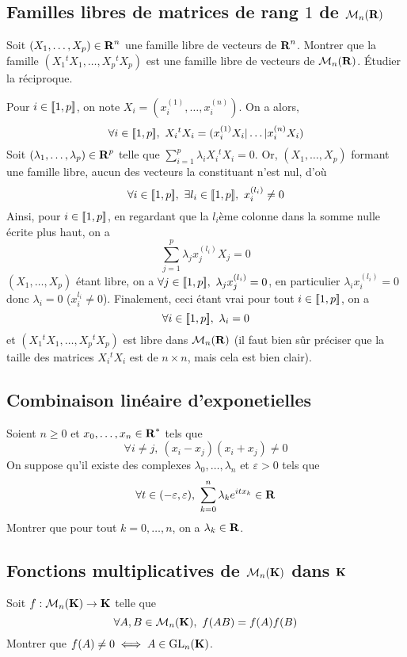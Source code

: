\subsection{Familles libres de matrices de rang $1$ de $\mathcal M_n(\operatorname{\mathbf{R}})$}
\begin{exercice}
	Soit $(X_1,\dots,X_p)\in\operatorname{\mathbf{R}}^n$ une famille libre de vecteurs de $\operatorname{\mathbf{R}}^n$. Montrer que la famille $(X_1{}^tX_1,\dots,X_p{}^tX_p)$ est une famille libre de vecteurs de $\mathcal M_n(\operatorname{\mathbf{R}})$. Étudier la réciproque.
\end{exercice}

\begin{correction}
    Pour $i\in[\![1,p]\!]$, on note $X_i=(x_i^{(1)},\dots,x_i^{(n)})$. On a alors, \[\forall i\in\inl1p,\ X_i{}^tX_i=(x_i^{(1)}X_i|\dots|x_i^{(n)}X_i)\]
    Soit $(\lambda_1,\dots,\lambda_p)\in\operatorname{\mathbf{R}}^p$ telle que $\sum_{i=1}^p\lambda_iX_i{}^tX_i=0$. Or, $(X_1,\dots,X_p)$ formant une famille libre, aucun des vecteurs la constituant n'est nul, d'où \[\forall i\in[\![1,p]\!],\ \exists l_i\in[\![1,p]\!],\ x_i^{(l_i)}\neq 0\]
    Ainsi, pour $i\in[\![1,p]\!]$, en regardant que la $l_i$ème colonne dans la somme nulle écrite plus haut, on a \[\sum_{j=1}^p\lambda_jx_j^{(l_i)}X_j=0\]
    $(X_1,\dots,X_p)$ étant libre, on a $\forall j\in\inl1p,\ \lambda_jx_j^{(l_i)}=0$, en particulier $\lambda_ix_i^{(l_i)}=0$ donc $\lambda_i=0$ ($x_i^{l_i}\neq 0$). Finalement, ceci étant vrai pour tout $i\in[\![1,p]\!]$, on a \[\forall i\in[\![1,p]\!],\ \lambda_i=0\]
    et $(X_1{}^tX_1,\dots,X_p{}^tX_p)$ est libre dans $\mathcal M_n(\operatorname{\mathbf{R}})$ (il faut bien sûr préciser que la taille des matrices $X_i{}^tX_i$ est de $n\times n$, mais cela est bien clair).
\end{correction}

\subsection{Combinaison linéaire d'exponetielles}

\begin{exercice}
    Soient $n\geq 0$ et $x_0,\dots,x_n\in\operatorname{\mathbf{R}}^*$ tels que 
    \[
        \forall i\neq j,\ (x_i-x_j)(x_i+x_j)\neq 0    
    \]
    On suppose qu'il existe des complexes $\lambda_0,\dots,\lambda_n$ et $\varepsilon > 0$ tels que 
    \[
        \forall t\in(-\varepsilon,\varepsilon),\ \sum_{k=0}^n\lambda_ke^{itx_k}\in\R    
    \]
    Montrer que pour tout $k=0,\dots,n$, on a $\lambda_k\in\operatorname{\mathbf{R}}$.
\end{exercice}

\begin{correction}
    [À rédiger]
\end{correction}

\subsection{Fonctions multiplicatives de $\mathcal M_n(\operatorname{\mathbf{K}})$ dans $\operatorname{\mathbf{K}}$}
\begin{exercice}
    Soit $f:\mathcal M_n(\operatorname{\mathbf{K}})\to \operatorname{\mathbf{K}}$ telle que 
    \[
        \forall A,B\in\mathcal M_n(\K),\ f(AB)=f(A)f(B)    
    \]
    Montrer que $f(A)\neq 0\iff A\in\operatorname{\mathrm{GL}}_n(\operatorname{\mathbf{K}})$.
\end{exercice}
    